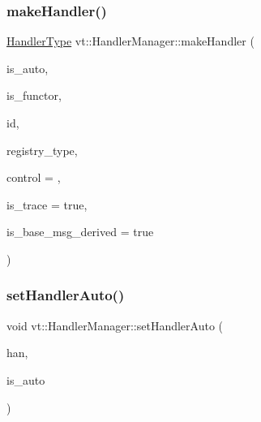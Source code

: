 \mbox{\label{structvt_1_1_handler_manager_a9b5a4951cb68592ca7bfaf8b68d62549}} 
\subsubsection{\texorpdfstring{make\+Handler()}{makeHandler()}}
{\footnotesize\ttfamily \hyperlink{namespacevt_af64846b57dfcaf104da3ef6967917573}{Handler\+Type} vt\+::\+Handler\+Manager\+::make\+Handler (\begin{DoxyParamCaption}\item[{bool}]{is\+\_\+auto,  }\item[{bool}]{is\+\_\+functor,  }\item[{\hyperlink{namespacevt_a59ae068fe828d1c33051ff96f3d016b6}{Handler\+Identifier\+Type}}]{id,  }\item[{\hyperlink{namespacevt_1_1auto__registry_a9f369ca2b484130b396729e2ddf05241}{Registry\+Type\+Enum} const}]{registry\+\_\+type,  }\item[{\hyperlink{namespacevt_adbbef13b92f0a93b14c219b7cc8a48f2}{Handler\+Control\+Type}}]{control = {},  }\item[{bool}]{is\+\_\+trace = {\ttfamily true},  }\item[{bool}]{is\+\_\+base\+\_\+msg\+\_\+derived = {\ttfamily true} }\end{DoxyParamCaption})\hspace{0.3cm}{\ttfamily [static]}}

\mbox{\label{structvt_1_1_handler_manager_a9100f9e0e946b58d98d104a5cbcf5574}} 
\subsubsection{\texorpdfstring{set\+Handler\+Auto()}{setHandlerAuto()}}
{\footnotesize\ttfamily void vt\+::\+Handler\+Manager\+::set\+Handler\+Auto (\begin{DoxyParamCaption}\item[{\hyperlink{namespacevt_af64846b57dfcaf104da3ef6967917573}{Handler\+Type} \&}]{han,  }\item[{bool}]{is\+\_\+auto }\end{DoxyParamCaption})\hspace{0.3cm}{\ttfamily [static]}}


